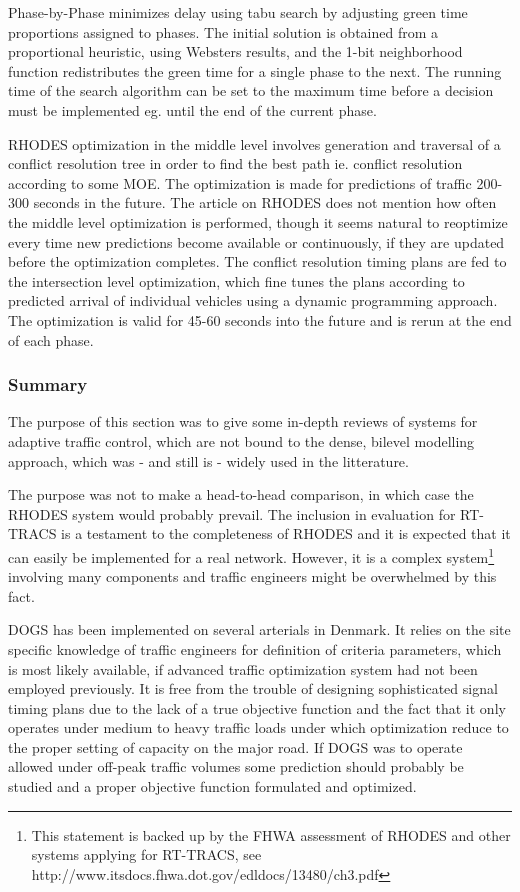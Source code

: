 Phase-by-Phase minimizes delay using tabu search by adjusting green time proportions assigned to phases. The initial solution is obtained from a proportional heuristic, using Websters results, and the 1-bit neighborhood function redistributes the green time for a single phase to the next. 
The running time of the search algorithm can be set to the maximum time before a decision must be implemented eg. until the end of the current phase.

RHODES optimization in the middle level involves generation and traversal of a conflict resolution tree in order to find the best path ie. conflict resolution according to some MOE. The optimization is made for predictions of traffic 200-300 seconds in the future. The article on RHODES does not mention how often the middle level optimization is performed, though it seems natural to reoptimize every time new predictions become available or continuously, if they are updated before the optimization completes.
The conflict resolution timing plans are fed to the intersection level optimization, which fine tunes the plans according to predicted arrival of individual vehicles using a dynamic programming approach. The optimization is valid for 45-60 seconds into the future and is rerun at the end of each phase.

\subsubsection*{Summary}
The purpose of this section was to give some in-depth reviews of systems for adaptive traffic control, which are not bound to the dense, bilevel modelling approach, which was - and still is - widely used in the litterature. 

The purpose was not to make a head-to-head comparison, in which case the RHODES system would probably prevail. The inclusion in evaluation for RT-TRACS is a testament to the completeness of RHODES and it is expected that it can easily be implemented for a real network. However, it is a complex system\footnote{This statement is backed up by the FHWA assessment of RHODES and other systems applying for RT-TRACS, see http://www.itsdocs.fhwa.dot.gov/edldocs/13480/ch3.pdf} involving many components and traffic engineers might be overwhelmed by this fact. 

DOGS has been implemented on several arterials in Denmark. It relies on the site specific knowledge of traffic engineers for definition of criteria parameters, which is most likely available, if advanced traffic optimization system had not been employed previously. It is free from the trouble of designing sophisticated signal timing plans due to the lack of a true objective function and the fact that it only operates under medium to heavy traffic loads under which optimization reduce to the proper setting of capacity on the major road. If DOGS was to operate allowed under off-peak traffic volumes some prediction should probably be studied and a proper objective function formulated and optimized.

